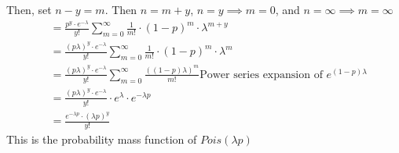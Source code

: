 \documentclass[11pt,oneside]{book}
\theoremstyle{break}
\theoremstyle{break}
\begin{document}
Then, set $n-y=m$. Then $n=m+y$, $n=y\implies m=0$, and $n=\infty \implies m=\infty$\begin{align*}
&=\frac{p^y \cdot e^{-\lambda}}{y!}\sum_{m=0}^{\infty}\frac{1}{m!}\cdot (1-p)^{m}\cdot \lambda^{m+y}\\
&=\frac{(p\lambda)^y \cdot e^{-\lambda}}{y!}\sum_{m=0}^{\infty}\frac{1}{m!}\cdot (1-p)^{m}\cdot \lambda^{m}\\
&=\frac{(p\lambda)^y \cdot e^{-\lambda}}{y!}\sum_{m=0}^{\infty}\frac{((1-p)\lambda)^{m}}{m!} \text{Power series expansion of }e^{(1-p)\lambda}\\
&=\frac{(p\lambda)^y \cdot e^{-\lambda}}{y!} \cdot e^{\lambda}\cdot e^{-\lambda p}\\
&=\frac{e^{-\lambda p}\cdot (\lambda p)^y}{y!}
\end{align*}
This is the probability mass function of $Pois(\lambda p)$
\end{document}
